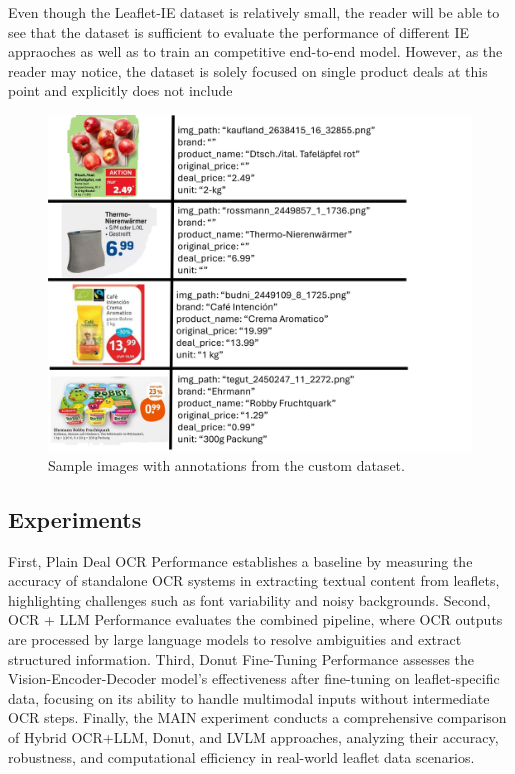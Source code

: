 \documentclass[11pt]{article}
\begin{document}
Even though the Leaflet-IE dataset is relatively small, the reader will be able to see that the dataset is sufficient to evaluate the performance of different IE appraoches as well as to train an competitive end-to-end model. However, as the reader may notice, the dataset is solely focused on single product deals at this point and explicitly does not include

\begin{figure}[h!]
\centering
\includegraphics[width=0.5\linewidth]{figures/ie_samples.png}
\caption{Sample images with annotations from the custom dataset.}
\label{fig:ie_dataset_samples}
\end{figure}

\subsection{Experiments}


First, Plain Deal OCR Performance establishes a baseline by measuring the accuracy of standalone OCR systems in extracting textual content from leaflets, highlighting challenges such as font variability and noisy backgrounds. Second, OCR + LLM Performance evaluates the combined pipeline, where OCR outputs are processed by large language models to resolve ambiguities and extract structured information. Third, Donut Fine-Tuning Performance assesses the Vision-Encoder-Decoder model's effectiveness after fine-tuning on leaflet-specific data, focusing on its ability to handle multimodal inputs without intermediate OCR steps. Finally, the MAIN experiment conducts a comprehensive comparison of Hybrid OCR+LLM, Donut, and LVLM approaches, analyzing their accuracy, robustness, and computational efficiency in real-world leaflet data scenarios.
\end{document}
